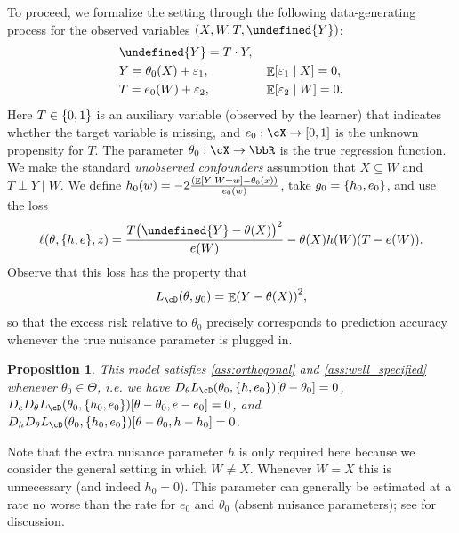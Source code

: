 \documentclass[11pt]{article} %
\newcommand{\pref}[1]{\cref{#1}}
\theoremstyle{theorem}  %
\newtheorem{proposition}{Proposition}
\theoremstyle{plain}
\DeclarePairedDelimiter{\brk}{[}{]}
\DeclarePairedDelimiter{\crl}{\{}{\}}
\DeclarePairedDelimiter{\prn}{(}{)}
\DeclareMathOperator{\En}{\mathbb{E}}
\newcommand{\ls}{\ell}
\newcommand{\veps}{\varepsilon}
\newcommand{\wt}[1]{\widetilde{#1}}
\let\wt\undefined
\newcommand{\wt}[1]{\widetilde{#1}}
\newcommand{\poprisk}{L_{\cD}}
\newcommand{\target}{\Theta}
\newcommand{\gttwo}{\theta_0}
\newcommand{\indep}{\perp}
\begin{document}
To proceed, we formalize the setting through the following data-generating process for the observed variables $(X,W,T,\wt{Y})$:
\begin{equation}
\label{eq:missing_data_least_squares}
\begin{aligned}
&\wt{Y} = T\cdot{}Y,&&\\
&Y = \theta_0(X)+\veps_1,&&\En\brk*{\veps_1\mid{}X}=0,\\
&T=e_0(W) + \veps_2,&&\En\brk*{\veps_2\mid{}W}=0.
\end{aligned}
\end{equation}
Here $T\in\crl*{0,1}$ is an auxiliary variable (observed by the learner) that indicates whether the target variable is missing, and $e_0:\cX\to\brk*{0,1}$ is the unknown propensity for $T$. The parameter $\theta_0:\cX\to\bbR$ is the true regression function. We make the standard \emph{unobserved confounders} assumption that $X\subseteq{}W$ and $T\indep{}Y\mid{}W$.
We define $h_0(w)=-2\frac{(\En\brk*{Y\mid{}W=w}-\theta_0(x))}{e_0(w)}$, take $g_0=\crl*{h_0,e_0}$, and use the loss
\begin{equation}
\ls(\theta,\crl*{h,e},z) = \frac{T\prn[\big]{\wt{Y}-\theta(X)}^{2}}{e(W)} - \theta(X)h(W)\prn*{T-e(W)}.
\end{equation}
Observe that this loss has the property that
\[
\poprisk(\theta,g_0) = \En\prn*{Y-\theta(X)}^{2},
\]
so that the excess risk relative to $\theta_0$ precisely corresponds to prediction accuracy whenever the true nuisance parameter is plugged in.
\begin{proposition}
  \label{prop:missing_data}
This model satisfies \pref{ass:orthogonal} and \pref{ass:well_specified} whenever $\gttwo\in\target$, i.e. we have $D_{\theta}\poprisk(\gttwo,\crl*{h,e_0})[\theta-\theta_{0}]=0$, $D_{e}D_{\theta}\poprisk(\gttwo,\crl*{h_0,e_0})[\theta-\theta_{0}, e-e_0]=0$, and $D_{h}D_{\theta}\poprisk(\gttwo,\crl*{h_0,e_0})[\theta-\theta_{0}, h-h_0]=0$.
\end{proposition}
Note that the extra nuisance parameter $h$ is only required here because we consider the general setting in which $W\neq{}X$. Whenever $W=X$ this is unnecessary (and indeed $h_0=0$). This parameter can generally be estimated at a rate no worse than the rate for $e_0$ and $\theta_0$ (absent nuisance parameters); see \cite{chernozhukov2018plugin} for discussion.
\end{document}
